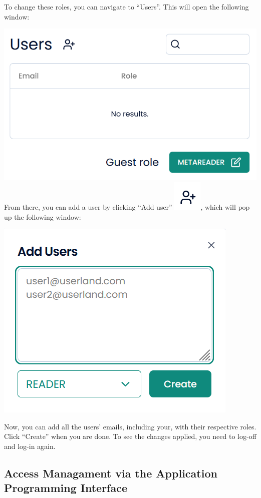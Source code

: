 \documentclass[
  letterpaper,
  DIV=11,
  numbers=noendperiod]{scrreprt}
\begin{document}
To change these roles, you can navigate to ``Users''. This will open the
following window:

\includegraphics{media/amcat-4.1-4.png} From there, you can add a user
by clicking ``Add user'' \includegraphics{media/amcat-4.1-5.png}, which
will pop up the following window:

\includegraphics{media/amcat-4.1-6.png}

Now, you can add all the users' emails, including your, with their
respective roles. Click ``Create'' when you are done. To see the changes
applied, you need to log-off and log-in again.

\subsection{Access Managament via the Application Programming
Interface}\label{access-managament-via-the-application-programming-interface}
\end{document}
